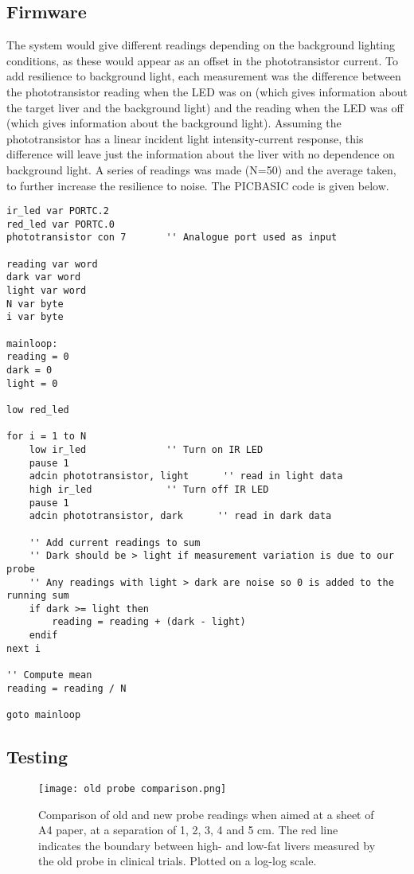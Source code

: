 \subsection{Firmware}
The system would give different readings depending on the background lighting conditions, as these would appear as an offset in the phototransistor current. To add resilience to background light, each measurement was the difference between the phototransistor reading when the LED was on (which gives information about the target liver and the background light) and the reading when the LED was off (which gives information about the background light). Assuming the phototransistor has a linear incident light intensity-current response, this difference will leave just the information about the liver with no dependence on background light. A series of readings was made (N=50) and the average taken, to further increase the resilience to noise. The PICBASIC code is given below.
\begin{lstlisting}
ir_led var PORTC.2
red_led var PORTC.0
phototransistor con 7       '' Analogue port used as input

reading var word
dark var word
light var word
N var byte
i var byte

mainloop:
reading = 0
dark = 0
light = 0

low red_led

for i = 1 to N
    low ir_led				'' Turn on IR LED
    pause 1
    adcin phototransistor, light      '' read in light data
    high ir_led				'' Turn off IR LED
    pause 1
    adcin phototransistor, dark      '' read in dark data
    
    '' Add current readings to sum
    '' Dark should be > light if measurement variation is due to our probe
    '' Any readings with light > dark are noise so 0 is added to the running sum
    if dark >= light then
        reading = reading + (dark - light)
    endif
next i  

'' Compute mean
reading = reading / N

goto mainloop
\end{lstlisting}






\subsection{Testing}
\begin{figure}[htbp]
	\centering
	\texttt{[image: old probe comparison.png]}
	\caption{Comparison of old and new probe readings when aimed at a sheet of A4 paper, at a separation of 1, 2, 3, 4 and 5 cm. The red line indicates the boundary between high- and low-fat livers measured by the old probe in clinical trials. Plotted on a log-log scale.}
	\label{fig: old probe comparison}
\end{figure}

